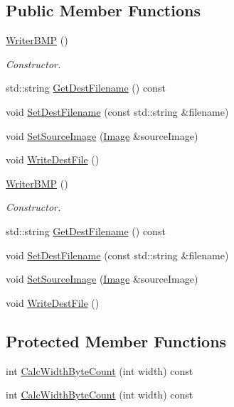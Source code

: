 \subsection*{Public Member Functions}
\begin{DoxyCompactItemize}
\item 
\hyperlink{classnoise_1_1utils_1_1_writer_b_m_p_a384b17e136f6e9ee7d05caaeec724c3e}{Writer\+B\+M\+P} ()
\begin{DoxyCompactList}\small\item\em Constructor. \end{DoxyCompactList}\item 
std\+::string \hyperlink{classnoise_1_1utils_1_1_writer_b_m_p_a5b55373dbe14a19c19532782c15bf764}{Get\+Dest\+Filename} () const 
\item 
void \hyperlink{classnoise_1_1utils_1_1_writer_b_m_p_a02ef2f6be88d1636bac1d3bf0c598393}{Set\+Dest\+Filename} (const std\+::string \&filename)
\item 
void \hyperlink{classnoise_1_1utils_1_1_writer_b_m_p_a62957bc808604c20d0388212777a1b4b}{Set\+Source\+Image} (\hyperlink{classnoise_1_1utils_1_1_image}{Image} \&source\+Image)
\item 
void \hyperlink{classnoise_1_1utils_1_1_writer_b_m_p_adb6cc4cb2b5ce8ba4240ebfd54ad631c}{Write\+Dest\+File} ()
\item 
\hyperlink{classnoise_1_1utils_1_1_writer_b_m_p_a384b17e136f6e9ee7d05caaeec724c3e}{Writer\+B\+M\+P} ()
\begin{DoxyCompactList}\small\item\em Constructor. \end{DoxyCompactList}\item 
std\+::string \hyperlink{classnoise_1_1utils_1_1_writer_b_m_p_a5b55373dbe14a19c19532782c15bf764}{Get\+Dest\+Filename} () const 
\item 
void \hyperlink{classnoise_1_1utils_1_1_writer_b_m_p_a02ef2f6be88d1636bac1d3bf0c598393}{Set\+Dest\+Filename} (const std\+::string \&filename)
\item 
void \hyperlink{classnoise_1_1utils_1_1_writer_b_m_p_a62957bc808604c20d0388212777a1b4b}{Set\+Source\+Image} (\hyperlink{classnoise_1_1utils_1_1_image}{Image} \&source\+Image)
\item 
void \hyperlink{classnoise_1_1utils_1_1_writer_b_m_p_a81f5b2ac820eb23f851a0a7ebd84a146}{Write\+Dest\+File} ()
\end{DoxyCompactItemize}
\subsection*{Protected Member Functions}
\begin{DoxyCompactItemize}
\item 
int \hyperlink{classnoise_1_1utils_1_1_writer_b_m_p_a1011299eb00f7bcceef198053a5170f4}{Calc\+Width\+Byte\+Count} (int width) const 
\item 
int \hyperlink{classnoise_1_1utils_1_1_writer_b_m_p_ab230ad020bce77c18a9ceadb7a297b50}{Calc\+Width\+Byte\+Count} (int width) const 
\end{DoxyCompactItemize}
